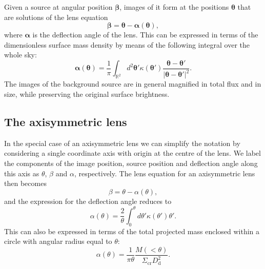\documentclass{aa}
\begin{document}
Given a source at angular position $\boldsymbol\beta$, images of it form at the positions $\boldsymbol\theta$ that are solutions of the lens equation
\begin{equation}\label{eq:lenseq}
\boldsymbol\beta = \boldsymbol\theta - \boldsymbol\alpha(\boldsymbol\theta),
\end{equation}
where $\boldsymbol\alpha$ is the deflection angle of the lens.
This can be expressed in terms of the dimensionless surface mass density by means of the following integral over the whole sky:
\begin{equation}
\boldsymbol\alpha(\boldsymbol\theta) = \frac{1}{\pi}\int_{\mathbb{R}^2} d^2\boldsymbol\theta' \kappa(\boldsymbol\theta')\dfrac{\boldsymbol\theta - \boldsymbol\theta'}{|\boldsymbol\theta - \boldsymbol\theta'|^2}.
\end{equation}
The images of the background source are in general magnified in total flux and in size, while preserving the original surface brightness.

\subsection{The axisymmetric lens}\label{ssec:axisymm}

In the special case of an axisymmetric lens we can simplify the notation by considering a single coordinate axis with origin at the centre of the lens. We label the components of the image position, source position and deflection angle along this axis as $\theta$, $\beta$ and $\alpha$, respectively.
The lens equation for an axisymmetric lens then becomes
\begin{equation}\label{eq:1dlenseq}
\beta = \theta - \alpha(\theta),
\end{equation}
and the expression for the deflection angle reduces to
\begin{equation}
\alpha(\theta) = \frac{2}{\theta}\int_0^{\theta} d\theta' \kappa(\theta') \theta'.
\end{equation}
This can also be expressed in terms of the total projected mass enclosed within a circle with angular radius equal to $\theta$:
\begin{equation}
\alpha(\theta) = \frac{1}{\pi\theta}\dfrac{M(<\theta)}{\Sigma_{\mathrm{cr}}D_{\mathrm{d}}^2}.
\end{equation}
\end{document}

